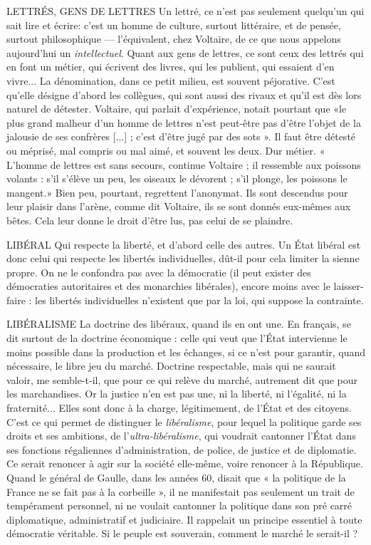 {LETTRÉS, GENS DE LETTRES Un lettré, ce n’est pas seulement quelqu'un
qui sait lire et écrire: c’est un
homme de culture, surtout littéraire, et de pensée, surtout philosophique —
l'équivalent, chez Voltaire, de ce que nous appelons aujourd’hui un {\it intellectuel}.
Quant aux gens de lettres, ce sont ceux des lettrés qui en font un
métier, qui écrivent des livres, qui les publient, qui essaient d’en vivre... La
dénomination, dans ce petit milieu, est souvent péjorative. C’est qu’elle
désigne d’abord les collègues, qui sont aussi des rivaux et qu’il est dès lors
naturel de détester. Voltaire, qui parlait d'expérience, notait pourtant que
«le plus grand malheur d’un homme de lettres n’est peut-être pas d’être
l’objet de la jalousie de ses confrères [...] ; c’est d’être jugé par des sots ». Il
faut être détesté ou méprisé, mal compris ou mal aimé, et souvent les deux.
Dur métier. « L'homme de lettres est sans secours, continue Voltaire ; il ressemble
aux poissons volants : s’il s'élève un peu, les oiseaux le dévorent ; s’il
plonge, les poissons le mangent.» Bien peu, pourtant, regrettent l’anonymat.
Ils sont descendus pour leur plaisir dans l'arène, comme dit Voltaire,
ils se sont donnés eux-mêmes aux bêtes. Cela leur donne le droit d’être lus,
pas celui de se plaindre.

LIBÉRAL Qui respecte la liberté, et d’abord celle des autres. Un État libéral
est donc celui qui respecte les libertés individuelles, dût-il pour
cela limiter la sienne propre. On ne le confondra pas avec la démocratie (il peut
exister des démocraties autoritaires et des monarchies libérales), encore moins
avec le laisser-faire : les libertés individuelles n’existent que par la loi, qui suppose
la contrainte.

LIBÉRALISME La doctrine des libéraux, quand ils en ont une. En français,
se dit surtout de la doctrine économique : celle qui veut que
l'État intervienne le moins possible dans la production et les échanges, si ce
n’est pour garantir, quand nécessaire, le libre jeu du marché. Doctrine respectable,
mais qui ne saurait valoir, me semble-t-il, que pour ce qui relève du
marché, autrement dit que pour les marchandises. Or la justice n’en est pas
une, ni la liberté, ni l'égalité, ni la fraternité... Elles sont donc à la charge, légitimement,
de l’État et des citoyens. C’est ce qui permet de distinguer le {\it libéralisme},
pour lequel la politique garde ses droits et ses ambitions, de l’{\it ultra-libéralisme},
qui voudrait cantonner l’État dans ses fonctions régaliennes
d'administration, de police, de justice et de diplomatie. Ce serait renoncer à
agir sur la société elle-même, voire renoncer à la République. Quand le général
de Gaulle, dans les années 60, disait que « la politique de la France ne se fait pas
à la corbeille », il ne manifestait pas seulement un trait de tempérament personnel,
ni ne voulait cantonner la politique dans son pré carré diplomatique,
administratif et judiciaire. Il rappelait un principe essentiel à toute démocratie
véritable. Si le peuple est souverain, comment le marché le serait-il ?

}
